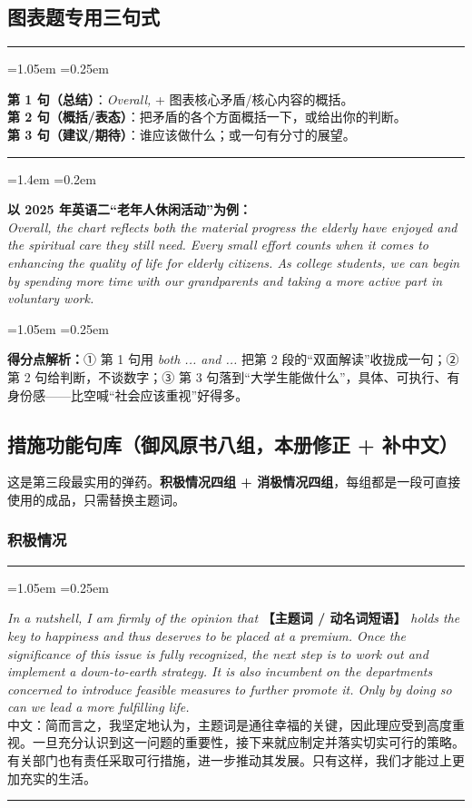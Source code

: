 \documentclass[11pt,a4paper]{ctexart}
\newcommand{\fillin}[1]{{\bfseries【#1】}}
\newcommand{\en}[1]{\textit{#1}}
\newenvironment{tpl}[1]{%
  \par\addvspace{7pt}\needspace{4\baselineskip}%
  \noindent{\bfseries\color{accent}#1}\par\nopagebreak
  \vspace{2pt}\noindent\rule{\linewidth}{0.7pt}\par\nopagebreak\vspace{3pt}%
  \begin{list}{}{\leftmargin=1.05em \rightmargin=0.25em \listparindent=0pt
    \itemindent=0pt \topsep=0pt \parsep=2.5pt \itemsep=2.5pt \partopsep=0pt}%
  \item\relax
}{%
  \end{list}\vspace{1pt}\noindent\rule{\linewidth}{0.7pt}\par\addvspace{8pt}%
}
\newenvironment{note}{%
  \par\addvspace{5pt}%
  \begin{list}{}{\leftmargin=1.05em \rightmargin=0.25em \listparindent=0pt
    \itemindent=0pt \topsep=0pt \parsep=2pt \itemsep=2pt \partopsep=0pt}%
  \item\relax\small\color{ink}%
}{%
  \end{list}\addvspace{5pt}%
}
\newenvironment{eg}{%
  \par\addvspace{4pt}%
  \begin{list}{}{\leftmargin=1.4em \rightmargin=0.2em \listparindent=0pt
    \itemindent=0pt \topsep=0pt \parsep=2pt \itemsep=2pt \partopsep=0pt}%
  \item\relax
}{%
  \end{list}\addvspace{5pt}%
}
\begin{document}
\subsection{图表题专用三句式}

\begin{tpl}{第 3 段公式（图表题）}
\textbf{第 1 句（总结）}：\en{Overall,} + 图表核心矛盾/核心内容的概括。\\
\textbf{第 2 句（概括/表态）}：把矛盾的各个方面概括一下，或给出你的判断。\\
\textbf{第 3 句（建议/期待）}：谁应该做什么；或一句有分寸的展望。
\end{tpl}

\begin{eg}
\textbf{以 2025 年英语二“老年人休闲活动”为例：}\\
\en{Overall, the chart reflects both the material progress the elderly have enjoyed and the spiritual care they still need. Every small effort counts when it comes to enhancing the quality of life for elderly citizens. As college students, we can begin by spending more time with our grandparents and taking a more active part in voluntary work.}
\end{eg}

\begin{note}
\textbf{得分点解析：}① 第 1 句用 \en{both ... and ...} 把第 2 段的“双面解读”收拢成一句；② 第 2 句给判断，不谈数字；③ 第 3 句落到“大学生能做什么”，具体、可执行、有身份感——比空喊“社会应该重视”好得多。
\end{note}

\subsection{措施功能句库（御风原书八组，本册修正 + 补中文）}

这是第三段最实用的弹药。\textbf{积极情况四组 + 消极情况四组}，每组都是一段可直接使用的成品，只需替换主题词。

\subsubsection{积极情况}

\begin{tpl}{积极一 · 总结 + 强调意义}
\en{In a nutshell, I am firmly of the opinion that} \fillin{主题词 / 动名词短语} \en{holds the key to happiness and thus deserves to be placed at a premium. Once the significance of this issue is fully recognized, the next step is to work out and implement a down-to-earth strategy. It is also incumbent on the departments concerned to introduce feasible measures to further promote it. Only by doing so can we lead a more fulfilling life.}\\[3pt]
中文：简而言之，我坚定地认为，主题词是通往幸福的关键，因此理应受到高度重视。一旦充分认识到这一问题的重要性，接下来就应制定并落实切实可行的策略。有关部门也有责任采取可行措施，进一步推动其发展。只有这样，我们才能过上更加充实的生活。
\end{tpl}
\end{document}
